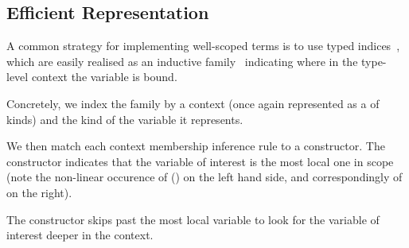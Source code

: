 \subsection{Efficient \DeBruijn{} Representation}
\label{sec:design:deBruijn}

A common strategy for implementing well-scoped terms is to use typed
\emph{\DeBruijn{}} indices~\cite{MANUAL:journals/math/debruijn72}, which are easily realised as an inductive family~\cite{DBLP:journals/fac/Dybjer94}
indicating where in the type-level context the variable is bound.

Concretely, we index the  family by a context
(once again represented as a  of kinds) and
the kind of the variable it represents.

\begin{center}
\begin{minipage}{0.10\textwidth}
\varRule
\end{minipage}\hfill
\begin{minipage}{0.80\textwidth}
\end{minipage}
\end{center}

We then match each context membership inference rule to a constructor.
%
The  constructor indicates that the variable of interest is
the most local one in scope (note the non-linear occurence of () on
the left hand side, and correspondingly of  on the right).

\begin{center}
\begin{minipage}{0.35\textwidth}
  \varZero
\end{minipage}\hfill
\begin{minipage}{0.55\textwidth}
\end{minipage}
\end{center}

The  constructor skips past the most local variable to look for the variable of interest deeper in the context.

\begin{center}
\begin{minipage}{0.35\textwidth}
  \varSuc
\end{minipage}\hfill
\begin{minipage}{0.55\textwidth}
\end{minipage}
\end{center}



